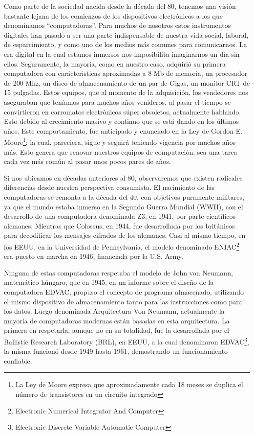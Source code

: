\documentclass[%
  	final,
%
	notitlepage,
	narroweqnarray,
	inline,
 	twoside,
	]{ieee}
\begin{document}
Como parte de la sociedad nacida desde la d\'ecada del 80, tenemos una visi\'on bastante lejana de los comienzos de los dispositivos electr\'onicos a los que denominamos ``computadoras''. Para muchos de nosotros estos instrumentos digitales han pasado a ser una parte indispensable de nuestra vida social, laboral, de esparcimiento, y como uno de los medios m\'as comunes para comunicarnos. La era digital en la cual estamos inmersos nos imposibilita imaginarnos un d\'ia sin ellos. 
Seguramente, la mayor\'ia, como en nuestro caso, adquiri\'o su primera computadora con car\'acteristicas aproximadas a 8 Mb de memoria, un procesador de 200 Mhz, un disco de almacenamiento de un par de Gigas, un monitor CRT de 15 pulgadas. Estos equipos, que al momento de la adquisici\'on, los vendedores nos aseguraban que ten\'iamos para muchos a\~nos venideros, al pasar el tiempo se convirtieron en carromatos electr\'onicos s\'uper obsoletos, actualmente hablando. Esto debido al crecimiento masivo y continuo que se est\'a dando en los \'ultimos a\~nos.
Este comportamiento, fue anticipado y enunciado en la Ley de Gordon E. Moore\footnote{La Ley de Moore expresa que aproximadamente cada 18 meses se duplica el n\'umero de transistores en un circuito integrado\cite{LeyMoore}}; la cual, pareciera, sigue y seguir\'a teniendo vigencia por muchos a\~nos m\'as. Esto genera que renovar nuestros equipos de computaci\'on, sea una tarea cada vez m\'as com\'un al pasar unos pocos pares de a\~nos.

Si nos ubicamos en d\'ecadas anteriores al 80, observaremos que existen radicales diferencias desde nuestra perspectiva consumista.
El nacimiento de las computadoras se remonta a la d\'ecada del 40, con objetivos puramente militares, ya que el mundo estaba inmerso en la Segundo Guerra Mundial (WWII), con el desarrollo de una computadora denominada Z3\cite{z3}, en 1941, por parte cient\'ificos alemanes. Mientras que Colossus\cite{colosus}, en 1944, fue desarrollada por los brit\'anicos para decodificar los mensajes cifrados de los alemanes. Casi al mismo tiempo, en los EEUU, en la Universidad de Pennsylvania, el modelo denominado ENIAC\footnote{Electronic Numerical Integrator And Computer\cite{eniac}} era puesto en marcha en 1946, financiada por la U.S. Army.

Ninguna de estas computadoras respetaba el modelo de John von Neumann, matem\'atico h\'ungaro, que en 1945, en un informe sobre el dise\~no de la computadora EDVAC, propuso el concepto de programa almacenado, utilizando el mismo dispositivo de almacenamiento tanto para las instrucciones como para los datos. Luego denominada Arquitectura Von Neumann\cite{newman}, actualmente la mayor\'ia de computadoras modernas est\'an basadas en esta arquitectura.
La primera en respetarla, aunque no en su totalidad, fue la desarrollada por el Ballistic Research Laboratory (BRL), en EEUU, a la cual denominaron EDVAC\footnote{Electronic Discrete Variable Automatic Computer\cite{edvac}}, la misma funcion\'o desde 1949 hasta 1961, demostrando un funcionamiento confiable.
\end{document}
